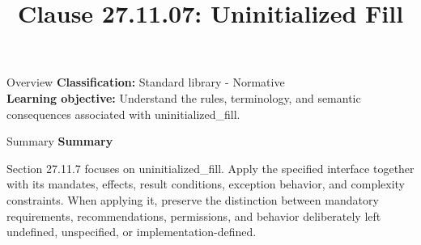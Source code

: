\documentclass[10pt,letterpaper]{article}
\title{Clause 27.11.07: Uninitialized Fill}
\author{}
\date{}
\begin{document}
\maketitle
\begin{CornellOverviewBox}{Overview}
\textbf{Classification:} Standard library - Normative\\[2pt]
\textbf{Learning objective:} Understand the rules, terminology, and semantic consequences associated with uninitialized\_fill.
\end{CornellOverviewBox}\begin{CornellSummaryBox}{Summary}
{\sffamily\bfseries\color{Accent} Summary}\par\vspace{3pt}Section 27.11.7 focuses on uninitialized\_fill. Apply the specified interface together with its mandates, effects, result conditions, exception behavior, and complexity constraints. When applying it, preserve the distinction between mandatory requirements, recommendations, permissions, and behavior deliberately left undefined, unspecified, or implementation-defined.
\end{CornellSummaryBox}
\end{document}
